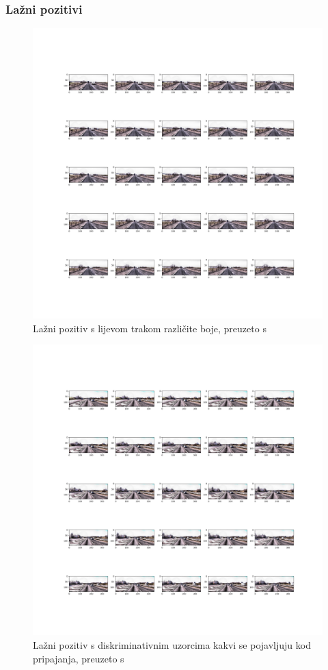 \documentclass[times, utf8, diplomski, numeric]{fer}
\begin{document}
\subsubsection{Lažni pozitivi }
\begin{figure}[H]
\centering
\includegraphics[scale=0.3]{images/fp_1.png}
\caption{Lažni pozitiv s lijevom trakom različite boje, preuzeto s \citep{url:ftts_irap}}
\label{img:fp_1}
\end{figure}

\begin{figure}[H]
\centering
\includegraphics[scale=0.3]{images/fp_2.png}
\caption{Lažni pozitiv s diskriminativnim uzorcima kakvi se pojavljuju kod pripajanja, preuzeto s \citep{url:ftts_irap}}
\label{img:fp_2}
\end{figure}
\end{document}
